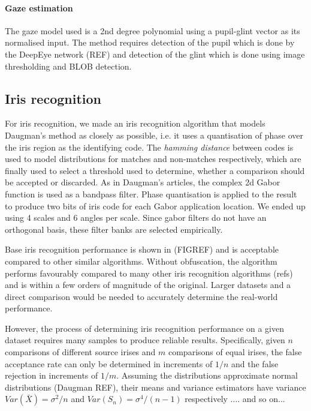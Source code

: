 \paragraph{Gaze estimation}

The gaze model used is a 2nd degree polynomial using a pupil-glint vector as its normalised input. The method requires detection of the pupil which is done by the DeepEye network (REF) and detection of the glint which is done using image thresholding and BLOB detection. 

\subsection{Iris recognition}

For iris recognition, we made an iris recognition algorithm that models Daugman's method as closely as possible, i.e. it uses a quantisation of phase over the iris region as the identifying code. The \emph{hamming distance} between codes is used to model distributions for matches and non-matches respectively, which are finally used to select a threshold used to determine, whether a comparison should be accepted or discarded. As in Daugman's articles, the complex 2d Gabor function is used as a bandpass filter. Phase quantisation is applied to the result to produce two bits of iris code for each Gabor application location. We ended up using 4 scales and 6 angles per scale. Since gabor filters do not have an orthogonal basis, these filter banks are selected empirically. 

Base iris recognition performance is shown in (FIGREF) and is acceptable compared to other similar algorithms. 
Without obfuscation, the algorithm performs favourably compared to many other iris recognition algorithms (refs) and is within a few orders of magnitude of the original. Larger datasets and a direct comparison would be needed to accurately determine the real-world performance. 

However, the process of determining iris recognition performance on a given dataset requires many samples to produce reliable results. Specifically, given $n$ comparisons of different source irises and $m$ comparisons of equal irises, the false acceptance rate can only be determined in increments of $1/n$ and the false rejection in increments of $1/m$. Assuming the distributions approximate normal distributions (Daugman REF), their means and variance estimators have variance $Var(\bar{X})=\sigma^2/n$ and $Var(S_n)=\sigma^4/(n-1)$ respectively .... and so on...

